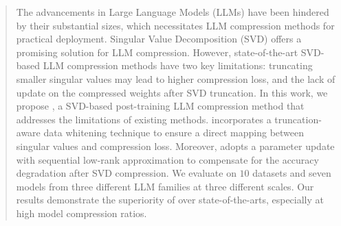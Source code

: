 \begin{abstract}
The advancements in Large Language Models (LLMs) have been hindered by their substantial sizes, which necessitates LLM compression methods for practical deployment. Singular Value Decomposition (SVD) offers a promising solution for LLM compression. However, state-of-the-art SVD-based LLM compression methods have two key limitations: truncating smaller singular values may lead to higher compression loss, and the lack of update on the compressed weights after SVD truncation. 
%
In this work, we propose \sysname, a SVD-based  post-training LLM compression method that addresses the limitations of existing methods. \sysname incorporates a truncation-aware data whitening technique to ensure a direct mapping between singular values and compression loss. Moreover, \sysname adopts a parameter update with sequential low-rank approximation to compensate for the accuracy degradation after SVD compression. 
%
We evaluate \sysname on $10$ datasets and seven models from three different LLM families at three different scales. Our results demonstrate the superiority of \sysname over state-of-the-arts, especially at high model compression ratios.
%


\end{abstract}